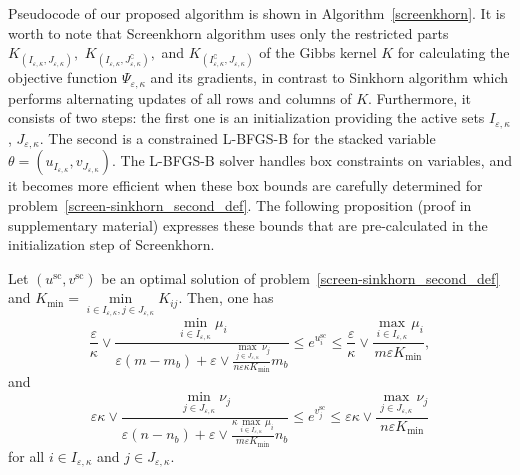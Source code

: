 Pseudocode of our proposed algorithm is shown in Algorithm~\ref{screenkhorn}. %
It is worth to note that Screenkhorn algorithm uses only the restricted parts $K_{(I_{\varepsilon,\kappa}, J_{\varepsilon,\kappa})},$ $K_{(I_{\varepsilon,\kappa}, J^\complement_{\varepsilon,\kappa})},$ and $K_{(I^\complement_{\varepsilon,\kappa}, J_{\varepsilon,\kappa})}$ of the Gibbs kernel $K$ for calculating the objective function $\Psi_{\varepsilon, \kappa}$ and its gradients, in contrast to Sinkhorn algorithm which performs alternating updates of all rows and columns of $K.$
Furthermore, it consists of two steps: the first one is an initialization providing the active sets $I_{\varepsilon,\kappa}$, $J_{\varepsilon,\kappa}$. 
The second is a constrained L-BFGS-B for the stacked variable $\theta=(u_{I_{\varepsilon,\kappa}},v_{J_{\varepsilon,\kappa}}).$ 
The L-BFGS-B solver handles box constraints on variables, and it becomes more efficient when these box bounds are carefully determined for problem~\eqref{screen-sinkhorn_second_def}. 
The following proposition (proof in supplementary material) expresses these bounds that are pre-calculated in the initialization step of Screenkhorn.

\begin{proposition}
\label{prop:bounds_of_usc_and_vsc}
Let $(u^{\text{sc}}, v^{\text{sc}})$ be an optimal solution of problem~\eqref{screen-sinkhorn_second_def} and $K_{\min} = \min\limits_{i\in I_{\varepsilon,\kappa},j \in J_{\varepsilon,\kappa}}K_{ij}$. Then,
one has
\begin{equation}
\label{bound_on_u}
\frac \varepsilon\kappa \vee \frac{\min_{i \in I_{\varepsilon,\kappa}}\mu_i}{\varepsilon (m- m_b) + \varepsilon \vee \frac{\max_{j\in J_{\varepsilon,\kappa}} \nu_j}{n\varepsilon\kappa K_{\min}} m_b} \leq e^{u^{\text{sc}}_i} \leq \frac \varepsilon\kappa\vee \frac{\max_{i \in I_{\varepsilon,\kappa}} \mu_i}{m\varepsilon K_{\min}},
\end{equation}
and
\begin{equation}
\label{bound_on_v}
\varepsilon\kappa \vee \frac{\min_{j \in J_{\varepsilon,\kappa}}\nu_j}{\varepsilon(n- n_b) + \varepsilon \vee \frac{\kappa\max_{i\in I_{\varepsilon,\kappa}} \mu_i}{m\varepsilon K_{\min} } n_b} \leq e^{v^{\text{sc}}_j} \leq \varepsilon\kappa \vee \frac{\max_{j \in J_{\varepsilon,\kappa}} \nu_j}{n\varepsilon K_{\min} }
\end{equation}
for all $i\in I_{\varepsilon,\kappa}$ and $j\in J_{\varepsilon,\kappa}$.
\end{proposition}


